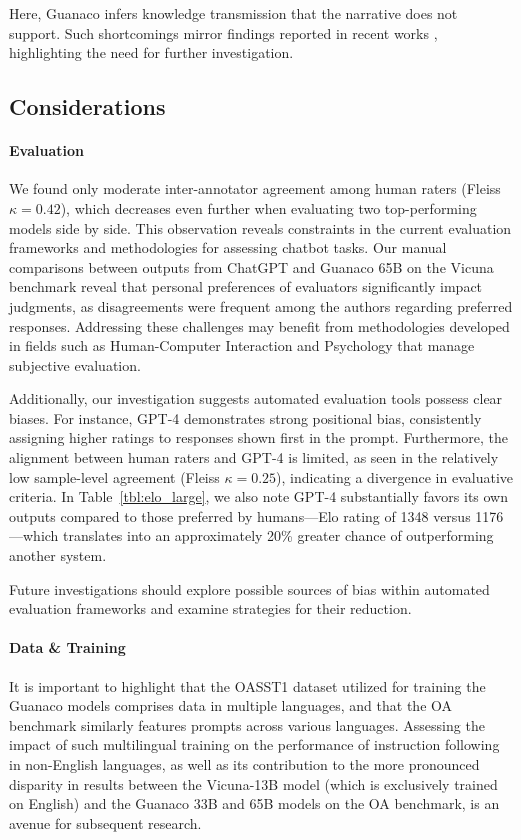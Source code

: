 Here, {Guanaco} infers knowledge transmission that the narrative does not support. Such shortcomings mirror findings reported in recent works \cite{sap2022neural}, highlighting the need for further investigation.

\subsection{Considerations}
\label{ssec:considerations}

\paragraph{Evaluation}

We found only moderate inter-annotator agreement among human raters (Fleiss $\kappa=0.42$), which decreases even further when evaluating two top-performing models side by side. This observation reveals constraints in the current evaluation frameworks and methodologies for assessing chatbot tasks. Our manual comparisons between outputs from ChatGPT and {Guanaco} 65B on the Vicuna benchmark reveal that personal preferences of evaluators significantly impact judgments, as disagreements were frequent among the authors regarding preferred responses. Addressing these challenges may benefit from methodologies developed in fields such as Human-Computer Interaction and Psychology that manage subjective evaluation.

Additionally, our investigation suggests automated evaluation tools possess clear biases. For instance, GPT-4 demonstrates strong positional bias, consistently assigning higher ratings to responses shown first in the prompt. Furthermore, the alignment between human raters and GPT-4 is limited, as seen in the relatively low sample-level agreement (Fleiss $\kappa=0.25$), indicating a divergence in evaluative criteria. In Table~\ref{tbl:elo_large}, we also note GPT-4 substantially favors its own outputs compared to those preferred by humans—Elo rating of 1348 versus 1176—which translates into an approximately 20\% greater chance of outperforming another system.

Future investigations should explore possible sources of bias within automated evaluation frameworks and examine strategies for their reduction.

\paragraph{Data \& Training} It is important to highlight that the OASST1 dataset utilized for training the {Guanaco} models comprises data in multiple languages, and that the OA benchmark similarly features prompts across various languages. Assessing the impact of such multilingual training on the performance of instruction following in non-English languages, as well as its contribution to the more pronounced disparity in results between the Vicuna-13B model (which is exclusively trained on English) and the {Guanaco} 33B and 65B models on the OA benchmark, is an avenue for subsequent research.

